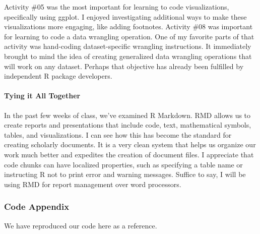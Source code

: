 \documentclass[
]{article}
\begin{document}
Activity \#05 was the most important for learning to code
visualizations, specifically using ggplot. I enjoyed investigating
additional ways to make these visualizations more engaging, like adding
footnotes. Activity \#08 was important for learning to code a data
wrangling operation. One of my favorite parts of that activity was
hand-coding dataset-specific wrangling instructions. It immediately
brought to mind the idea of creating generalized data wrangling
operations that will work on any dataset. Perhaps that objective has
already been fulfilled by independent R package developers.

\hypertarget{tying-it-all-together}{%
\paragraph{Tying it All Together}\label{tying-it-all-together}}

In the past few weeks of class, we've examined R Markdown. RMD allows us
to create reports and presentations that include code, text,
mathematical symbols, tables, and visualizations. I can see how this has
become the standard for creating scholarly documents. It is a very clean
system that helps us organize our work much better and expedites the
creation of document files. I appreciate that code chunks can have
localized properties, such as specifying a table name or instructing R
not to print error and warning messages. Suffice to say, I will be using
RMD for report management over word processors.

\hypertarget{code-appendix}{%
\subsubsection{Code Appendix}\label{code-appendix}}

We have reproduced our code here as a reference.
\end{document}
